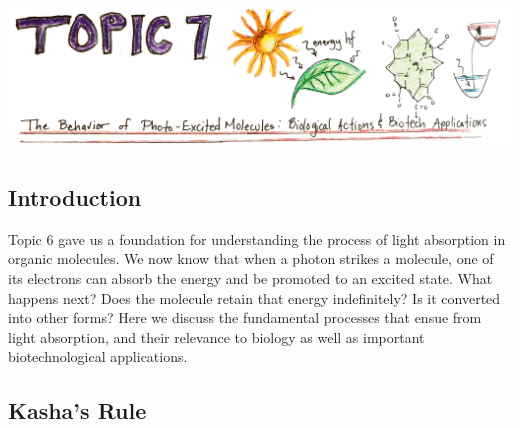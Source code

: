\setcounter{chapter}{7}
\setcounter{section}{0}
\setcounter{figure}{0}
\setcounter{equation}{0}
\setcounter{table}{0}
\chapter*{\includegraphics[width=\textwidth]{./figures/Topic7/Topic7.jpg}}

\section{Introduction}

Topic 6 gave us a foundation for understanding the process of light absorption in organic molecules.  We now know that when a photon strikes a molecule, one of its electrons can absorb the energy and be promoted to an excited state. What happens next? Does the molecule retain that energy indefinitely? Is it converted into other forms? Here we discuss the fundamental processes that ensue from light absorption, and their relevance to biology as well as important biotechnological applications. 

\section{Kasha's Rule}

